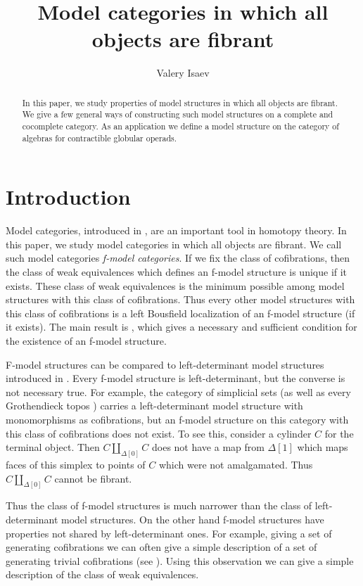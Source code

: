 \documentclass{amsart}
\author{Valery Isaev}
\title{Model categories in which all objects are fibrant}
\theoremstyle{definition}
\begin{document}
\begin{abstract}
In this paper, we study properties of model structures in which all objects are fibrant.
We give a few general ways of constructing such model structures on a complete and cocomplete category.
As an application we define a model structure on the category of algebras for contractible globular operads.
\end{abstract}

\maketitle

 \makeatletter
    \providecommand\@dotsep{5}
  \makeatother
  \listoftodos\relax

\section{Introduction}

Model categories, introduced in \cite{quillen}, are an important tool in homotopy theory.
In this paper, we study model categories in which all objects are fibrant.
We call such model categories \emph{f-model categories}.
If we fix the class of cofibrations, then the class of weak equivalences which defines an f-model structure is unique if it exists.
These class of weak equivalences is the minimum possible among model structures with this class of cofibrations.
Thus every other model structures with this class of cofibrations is a left Bousfield localization of an f-model structure (if it exists).
The main result is , which gives a necessary and sufficient condition for the existence of an f-model structure.

F-model structures can be compared to left-determinant model structures introduced in \cite{left-det}.
Every f-model structure is left-determinant, but the converse is not necessary true.
For example, the category of simplicial sets (as well as every Grothendieck topos \cite{cisinski})
carries a left-determinant model structure with monomorphisms as cofibrations,
but an f-model structure on this category with this class of cofibrations does not exist.
To see this, consider a cylinder $C$ for the terminal object.
Then $C \amalg_{\Delta[0]} C$ does not have a map from $\Delta[1]$ which
maps faces of this simplex to points of $C$ which were not amalgamated.
Thus $C \amalg_{\Delta[0]} C$ cannot be fibrant.

Thus the class of f-model structures is much narrower than the class of left-determinant model structures.
On the other hand f-model structures have properties not shared by left-determinant ones.
For example, giving a set of generating cofibrations we can often give
a simple description of a set of generating trivial cofibrations (see ).
Using this observation we can give a simple description of the class of weak equivalences.
\end{document}
